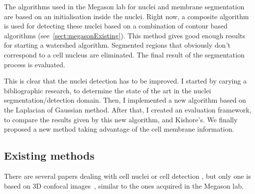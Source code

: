 The algorithms used in the Megason lab for nuclei and membrane segmentation are based on an initialisation inside the nuclei.
Right now, a composite algorithm is used for detecting these nuclei based on a combination of contour based algorithms (see~\ref{sect:megasonExisting}).
This method gives good enough results for starting a watershed algorithm. Segmented regions that obviously don't correspond to a cell nucleus are eliminated. The final result of the segmentation process is evaluated.


This is clear that  the nuclei detection has to be improved.
I started by carying a bibliographic research, to determine the state of the art in the nuclei segmentation/detection domain.
Then, I implemented a new algorithm based on the Laplacian of Gaussian method.
After that, I created an evaluation framework, to compare the results given by this new algorithm, and Kishore's.
We finally proposed a new method taking advantage of the cell membrane information.



\subsection{Existing methods}

There are several papers dealing with cell nuclei or cell detection 
\cite{loukas2003image,umesh2001efficient,al2009improved},
but only one is based on 3D confocal images~\cite{li20073}, similar to the ones acquired in the Megason lab.

